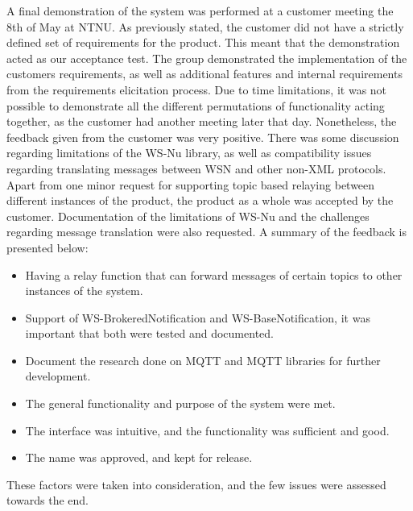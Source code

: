 A final demonstration of the system was performed at a customer meeting the 8th of May at NTNU. As previously stated, the customer did not have a strictly defined set of requirements for the product. This meant that the demonstration acted as our acceptance test. The group demonstrated the implementation of the customers requirements, as well as additional features and internal requirements from the requirements elicitation process. Due to time limitations, it was not possible to demonstrate all the different permutations of functionality acting together, as the customer had another meeting later that day. Nonetheless, the feedback given from the customer was very positive. There was some discussion regarding limitations of the WS-Nu library, as well as compatibility issues regarding translating messages between WSN and other non-XML protocols. Apart from one minor request for supporting topic based relaying between different instances of the product, the product as a whole was accepted by the customer. Documentation of the limitations of WS-Nu and the challenges regarding message translation were also requested. A summary of the feedback is presented below:

\begin{itemize}
\item Having a relay function that can forward messages of certain topics to other instances of the system.
\item Support of WS-BrokeredNotification \cite{wsn-brokerednotification} and WS-BaseNotification, it was important that both were tested and documented.
\item Document the research done on MQTT and MQTT libraries for further development.
\item The general functionality and purpose of the system were met.
\item The interface was intuitive, and the functionality was sufficient and good.
\item The name was approved, and kept for release.
\end{itemize}

These factors were taken into consideration, and the few issues were assessed towards the end.

\clearpage